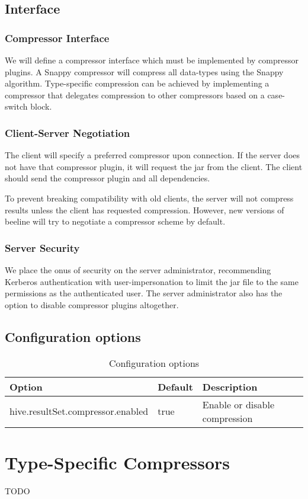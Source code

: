 \documentclass[11pt,a4paper]{article}
\begin{document}
	\subsection{Interface}
		\subsubsection{Compressor Interface}
			We will define a compressor interface which must be implemented by compressor plugins.
			A Snappy compressor will compress all data-types using the Snappy algorithm.
			Type-specific compression can be achieved by implementing a compressor that delegates compression to other compressors based on a case-switch block.
		
		
		\subsubsection{Client-Server Negotiation}
			The client will specify a preferred compressor upon connection. 
			If the server does not have that compressor plugin, it will request the jar from the client. 
			The client should send the compressor plugin and all dependencies.
		
			To prevent breaking compatibility with old clients, the server will not compress results unless the client has requested compression.
			However, new versions of beeline will try to negotiate a compressor scheme by default.
		
		\subsubsection{Server Security}
			We place the onus of security on the server administrator, recommending Kerberos authentication with user-impersonation to limit the jar file to the same permissions as the authenticated user. 
			The server administrator also has the option to disable compressor plugins altogether.
		
		
	\subsection{Configuration options}
	\begin{table}[!h]
		\begin{tabular}{| l | l | p{4cm} |} \hline
			\textbf{Option} & \textbf{Default} & \textbf{Description} \\ \hline
			hive.resultSet.compressor.enabled & true & Enable or disable compression \\ \hline
		\end{tabular}
		\caption{Configuration options}
	\end{table}

\section{Type-Specific Compressors}
	TODO
\end{document}
